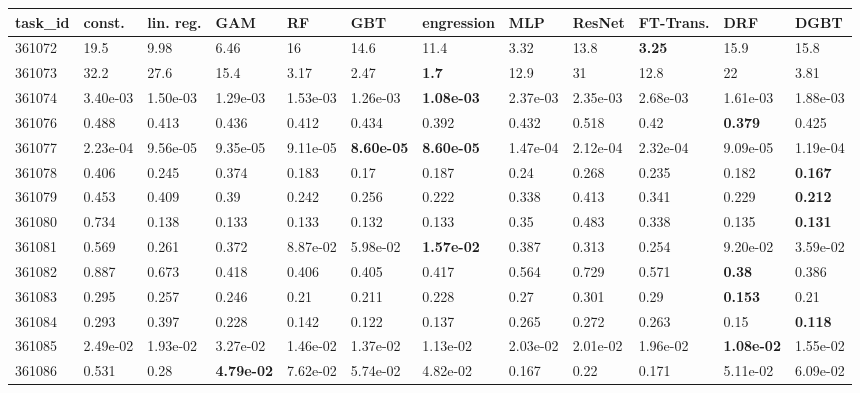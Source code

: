 \begin{table}[ht!]
\centering
\begingroup\footnotesize
\begin{tabular}{llllllllllll}
  \hline
\hline
task\_id & const. & lin. reg. & GAM & RF & GBT & engression & MLP & ResNet & FT-Trans. & DRF & DGBT \\ 
  \hline
361072 & 19.5 & 9.98 & 6.46 & 16 & 14.6 & 11.4 & 3.32 & 13.8 & \textbf{3.25} & 15.9 & 15.8 \\ 
  361073 & 32.2 & 27.6 & 15.4 & 3.17 & 2.47 & \textbf{1.7} & 12.9 & 31 & 12.8 & 22 & 3.81 \\ 
  361074 & 3.40e-03 & 1.50e-03 & 1.29e-03 & 1.53e-03 & 1.26e-03 & \textbf{1.08e-03} & 2.37e-03 & 2.35e-03 & 2.68e-03 & 1.61e-03 & 1.88e-03 \\ 
  361076 & 0.488 & 0.413 & 0.436 & 0.412 & 0.434 & 0.392 & 0.432 & 0.518 & 0.42 & \textbf{0.379} & 0.425 \\ 
  361077 & 2.23e-04 & 9.56e-05 & 9.35e-05 & 9.11e-05 & \textbf{8.60e-05} & \textbf{8.60e-05} & 1.47e-04 & 2.12e-04 & 2.32e-04 & 9.09e-05 & 1.19e-04 \\ 
  361078 & 0.406 & 0.245 & 0.374 & 0.183 & 0.17 & 0.187 & 0.24 & 0.268 & 0.235 & 0.182 & \textbf{0.167} \\ 
  361079 & 0.453 & 0.409 & 0.39 & 0.242 & 0.256 & 0.222 & 0.338 & 0.413 & 0.341 & 0.229 & \textbf{0.212} \\ 
  361080 & 0.734 & 0.138 & 0.133 & 0.133 & 0.132 & 0.133 & 0.35 & 0.483 & 0.338 & 0.135 & \textbf{0.131} \\ 
  361081 & 0.569 & 0.261 & 0.372 & 8.87e-02 & 5.98e-02 & \textbf{1.57e-02} & 0.387 & 0.313 & 0.254 & 9.20e-02 & 3.59e-02 \\ 
  361082 & 0.887 & 0.673 & 0.418 & 0.406 & 0.405 & 0.417 & 0.564 & 0.729 & 0.571 & \textbf{0.38} & 0.386 \\ 
  361083 & 0.295 & 0.257 & 0.246 & 0.21 & 0.211 & 0.228 & 0.27 & 0.301 & 0.29 & \textbf{0.153} & 0.21 \\ 
  361084 & 0.293 & 0.397 & 0.228 & 0.142 & 0.122 & 0.137 & 0.265 & 0.272 & 0.263 & 0.15 & \textbf{0.118} \\ 
  361085 & 2.49e-02 & 1.93e-02 & 3.27e-02 & 1.46e-02 & 1.37e-02 & 1.13e-02 & 2.03e-02 & 2.01e-02 & 1.96e-02 & \textbf{1.08e-02} & 1.55e-02 \\ 
  361086 & 0.531 & 0.28 & \textbf{4.79e-02} & 7.62e-02 & 5.74e-02 & 4.82e-02 & 0.167 & 0.22 & 0.171 & 5.11e-02 & 6.09e-02 \\ 

\end{tabular}
\end{table}
